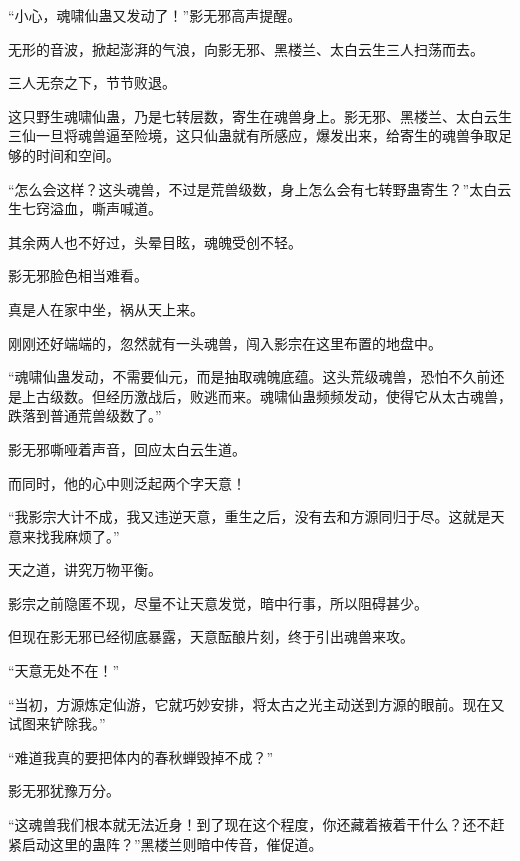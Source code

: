 \begin{this_body}
“小心，魂啸仙蛊又发动了！”影无邪高声提醒。

无形的音波，掀起澎湃的气浪，向影无邪、黑楼兰、太白云生三人扫荡而去。

三人无奈之下，节节败退。

这只野生魂啸仙蛊，乃是七转层数，寄生在魂兽身上。影无邪、黑楼兰、太白云生三仙一旦将魂兽逼至险境，这只仙蛊就有所感应，爆发出来，给寄生的魂兽争取足够的时间和空间。

“怎么会这样？这头魂兽，不过是荒兽级数，身上怎么会有七转野蛊寄生？”太白云生七窍溢血，嘶声喊道。

其余两人也不好过，头晕目眩，魂魄受创不轻。

影无邪脸色相当难看。

真是人在家中坐，祸从天上来。

刚刚还好端端的，忽然就有一头魂兽，闯入影宗在这里布置的地盘中。

“魂啸仙蛊发动，不需要仙元，而是抽取魂魄底蕴。这头荒级魂兽，恐怕不久前还是上古级数。但经历激战后，败逃而来。魂啸仙蛊频频发动，使得它从太古魂兽，跌落到普通荒兽级数了。”

影无邪嘶哑着声音，回应太白云生道。

而同时，他的心中则泛起两个字天意！

“我影宗大计不成，我又违逆天意，重生之后，没有去和方源同归于尽。这就是天意来找我麻烦了。”

天之道，讲究万物平衡。

影宗之前隐匿不现，尽量不让天意发觉，暗中行事，所以阻碍甚少。

但现在影无邪已经彻底暴露，天意酝酿片刻，终于引出魂兽来攻。

“天意无处不在！”

“当初，方源炼定仙游，它就巧妙安排，将太古之光主动送到方源的眼前。现在又试图来铲除我。”

“难道我真的要把体内的春秋蝉毁掉不成？”

影无邪犹豫万分。

“这魂兽我们根本就无法近身！到了现在这个程度，你还藏着掖着干什么？还不赶紧启动这里的蛊阵？”黑楼兰则暗中传音，催促道。

\end{this_body}

